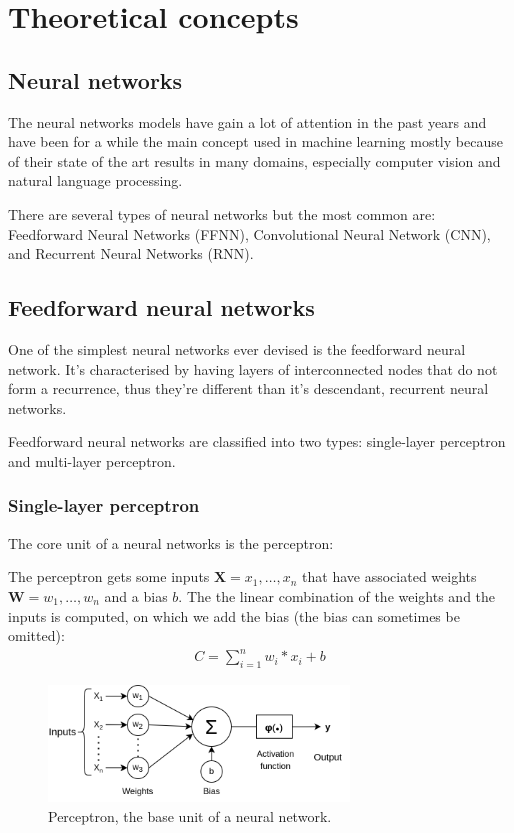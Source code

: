 \documentclass{report}[12pt, a4paper]
\begin{document}
\chapter{Theoretical concepts}

\section{Neural networks}

The neural networks models have gain a lot of attention in the past years and have been for a while the main concept used in machine learning mostly because of their state of the art results in many domains, especially computer vision and natural language processing.

There are several types of neural networks but the most common are: Feedforward Neural Networks (FFNN), Convolutional Neural Network (CNN), and Recurrent Neural Networks (RNN).

\section{Feedforward neural networks}

One of the simplest neural networks ever devised is the feedforward neural network. It's characterised by having layers of interconnected nodes that do not form a recurrence, thus they're different than it's descendant, recurrent neural networks.

Feedforward neural networks are classified into two types: single-layer perceptron and multi-layer perceptron.

\subsection{Single-layer perceptron}

The core unit of a neural networks is the perceptron:

The perceptron gets some inputs $\boldsymbol{X} = x_{1}, \dots ,x_{n}$ that have associated weights $\boldsymbol{W} = w_{1}, \dots ,w_{n}$ and a bias $b$. The the linear combination of the weights and the inputs is computed, on which we add the bias (the bias can sometimes be omitted):
\begin{align*}
    C = \sum_{i=1}^n w_{i} * x_{i} + b
\end{align*}

\begin{figure}[htp]
    \centering
    \includegraphics[width=8cm]{perceptron_diagram}
    \caption{Perceptron, the base unit of a neural network.}
    \label{fig:perceptron_diagram}
\end{figure}
\end{document}
